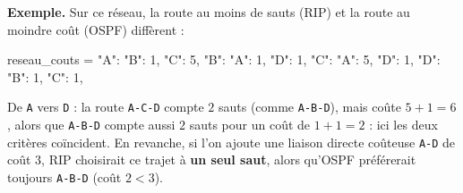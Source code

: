 \textbf{Exemple.} Sur ce réseau, la route au moins de sauts (RIP) et la route au moindre coût (OSPF) diffèrent :
\begin{python}
reseau_couts = {
    "A": {"B": 1, "C": 5},
    "B": {"A": 1, "D": 1},
    "C": {"A": 5, "D": 1},
    "D": {"B": 1, "C": 1},
}
\end{python}
De \texttt{A} vers \texttt{D} : la route \texttt{A-C-D} compte $2$ sauts (comme \texttt{A-B-D}), mais coûte $5+1=6$, alors que \texttt{A-B-D} compte aussi $2$ sauts pour un coût de $1+1=2$ : ici les deux critères coïncident. En revanche, si l'on ajoute une liaison directe coûteuse \texttt{A-D} de coût $3$, RIP choisirait ce trajet à \textbf{un seul saut}, alors qu'OSPF préférerait toujours \texttt{A-B-D} (coût $2 < 3$).

%
%

